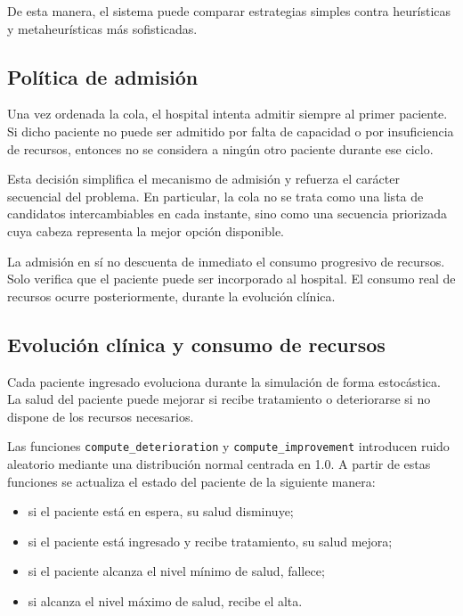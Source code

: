 \documentclass[12pt,a4paper]{article}
\begin{document}
De esta manera, el sistema puede comparar estrategias simples contra heurísticas y metaheurísticas más sofisticadas.

\subsection{Política de admisión}

Una vez ordenada la cola, el hospital intenta admitir siempre al primer paciente. 
Si dicho paciente no puede ser admitido por falta de capacidad o por insuficiencia de recursos, 
entonces no se considera a ningún otro paciente durante ese ciclo.

Esta decisión simplifica el mecanismo de admisión y refuerza el carácter secuencial del problema. 
En particular, la cola no se trata como una lista de candidatos intercambiables en cada instante, 
sino como una secuencia priorizada cuya cabeza representa la mejor opción disponible.

La admisión en sí no descuenta de inmediato el consumo progresivo de recursos. 
Solo verifica que el paciente puede ser incorporado al hospital. 
El consumo real de recursos ocurre posteriormente, durante la evolución clínica.

\subsection{Evolución clínica y consumo de recursos}

Cada paciente ingresado evoluciona durante la simulación de forma estocástica. 
La salud del paciente puede mejorar si recibe tratamiento o deteriorarse si no dispone de los recursos necesarios.

Las funciones \texttt{compute\_deterioration} y \texttt{compute\_improvement} introducen ruido aleatorio 
mediante una distribución normal centrada en 1.0. A partir de estas funciones se actualiza el estado del 
paciente de la siguiente manera:

\begin{itemize}
    \item si el paciente está en espera, su salud disminuye;
    \item si el paciente está ingresado y recibe tratamiento, su salud mejora;
    \item si el paciente alcanza el nivel mínimo de salud, fallece;
    \item si alcanza el nivel máximo de salud, recibe el alta.
\end{itemize}
\end{document}
